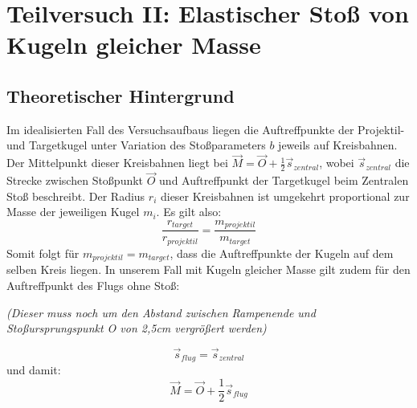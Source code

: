 \documentclass{report}
\begin{document}
\newpage
\section{Teilversuch II: Elastischer Stoß von Kugeln gleicher \newline Masse}
    \subsection{Theoretischer Hintergrund}
    Im idealisierten Fall des Versuchsaufbaus liegen die Auftreffpunkte der Projektil- und Targetkugel unter Variation des Stoßparameters $b$ jeweils auf Kreisbahnen.
    Der Mittelpunkt dieser Kreisbahnen liegt bei $\vec{M} = \vec{O} + \frac{1}{2} \vec{s}_{zentral}$, wobei $\vec{s}_{zentral}$ die Strecke zwischen Stoßpunkt $\vec{O}$ und Auftreffpunkt der Targetkugel beim Zentralen Stoß beschreibt.
    Der Radius $r_i$ dieser Kreisbahnen ist umgekehrt proportional zur Masse der jeweiligen Kugel $m_i$.
    Es gilt also:
    \begin{equation}
        \frac{r_{target}}{r_{projektil}} = \frac{m_{projektil}}{m_{target}}
    \end{equation}
    Somit folgt für $m_{projektil} = m_{target}$, dass die Auftreffpunkte der Kugeln auf dem selben Kreis liegen.
    In unserem Fall mit Kugeln gleicher Masse gilt zudem für den Auftreffpunkt des Flugs ohne Stoß:
    
    \noindent
    \textit{(Dieser muss noch um den Abstand zwischen Rampenende und Stoßursprungspunkt O von 2,5cm vergrößert werden)}
    
    \begin{equation}
        \vec{s}_{flug} = \vec{s}_{zentral}
    \end{equation}
    und damit:
    \begin{equation}
        \vec{M} = \vec{O} + \frac{1}{2} \vec{s}_{flug}
    \end{equation}
\end{document}
